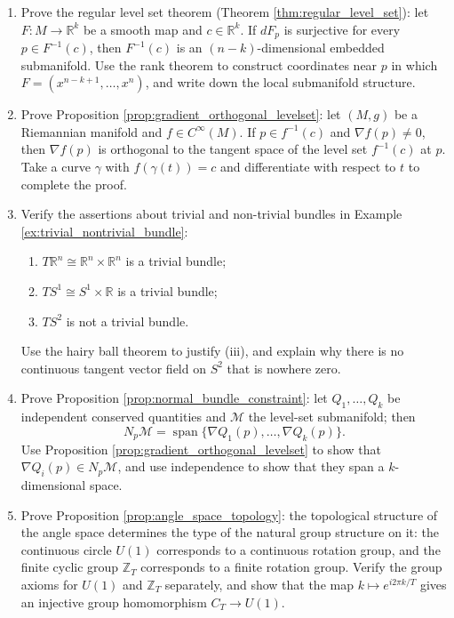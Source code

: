 \begin{enumerate}[leftmargin=3em, label=\textbf{Exercise \arabic*}]
    \item Prove the regular level set theorem (Theorem \ref{thm:regular_level_set}):
    let $F:M\to\mathbb{R}^k$ be a smooth map and $c\in\mathbb{R}^k$.
    If $dF_p$ is surjective for every $p\in F^{-1}(c)$,
    then $F^{-1}(c)$ is an $(n-k)$-dimensional embedded submanifold.
    Use the rank theorem to construct coordinates near $p$ in which $F=(x^{n-k+1},\dots,x^n)$,
    and write down the local submanifold structure.

    \item Prove Proposition \ref{prop:gradient_orthogonal_levelset}:
    let $(M,g)$ be a Riemannian manifold and $f\in C^\infty(M)$.
    If $p\in f^{-1}(c)$ and $\nabla f(p)\neq0$,
    then $\nabla f(p)$ is orthogonal to the tangent space of the level set $f^{-1}(c)$ at $p$.
    Take a curve $\gamma$ with $f(\gamma(t))=c$ and differentiate with respect to $t$ to complete the proof.

    \item Verify the assertions about trivial and non-trivial bundles in Example \ref{ex:trivial_nontrivial_bundle}:
    \begin{enumerate}[label=(\roman*)]
        \item $T\mathbb{R}^n\cong\mathbb{R}^n\times\mathbb{R}^n$ is a trivial bundle;
        \item $TS^1\cong S^1\times\mathbb{R}$ is a trivial bundle;
        \item $TS^2$ is not a trivial bundle.
    \end{enumerate}
    Use the hairy ball theorem to justify (iii), and explain why there is no continuous tangent vector field on $S^2$ that is nowhere zero.

    \item Prove Proposition \ref{prop:normal_bundle_constraint}:
    let $Q_1,\dots,Q_k$ be independent conserved quantities and $\mathcal{M}$ the level-set submanifold; then
    \[
    N_p\mathcal{M}=\operatorname{span}\{\nabla Q_1(p),\dots,\nabla Q_k(p)\}.
    \]
    Use Proposition \ref{prop:gradient_orthogonal_levelset} to show that $\nabla Q_i(p)\in N_p\mathcal{M}$,
    and use independence to show that they span a $k$-dimensional space.

    \item Prove Proposition \ref{prop:angle_space_topology}:
    the topological structure of the angle space determines the type of the natural group structure on it:
    the continuous circle $U(1)$ corresponds to a continuous rotation group, and the finite cyclic group $\mathbb{Z}_T$ corresponds to a finite rotation group.
    Verify the group axioms for $U(1)$ and $\mathbb{Z}_T$ separately,
    and show that the map $k\mapsto e^{i2\pi k/T}$ gives an injective group homomorphism $C_T\to U(1)$.


\end{enumerate}
